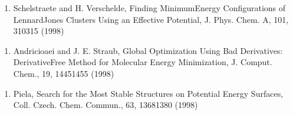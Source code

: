 \documentclass[letterpaper,11pt,english]{sphinxmanual}
\begin{document}
\begin{enumerate}
%
\setcounter{enumi}{18}
\item {} 
Schelstraete and H. Verschelde, Finding Minimum\sphinxhyphen{}Energy Configurations of Lennard\sphinxhyphen{}Jones Clusters Using an Effective Potential, J. Phys. Chem. A, 101, 310\sphinxhyphen{}315 (1998)

\end{enumerate}
\begin{enumerate}
%
\item {} 
Andricioaei and J. E. Straub, Global Optimization Using Bad Derivatives: Derivative\sphinxhyphen{}Free Method for Molecular Energy Minimization, J. Comput. Chem., 19, 1445\sphinxhyphen{}1455 (1998)

\end{enumerate}
\begin{enumerate}
%
\setcounter{enumi}{11}
\item {} 
Piela, Search for the Most Stable Structures on Potential Energy Surfaces, Coll. Czech. Chem. Commun., 63, 1368\sphinxhyphen{}1380 (1998)

\end{enumerate}
\end{document}
